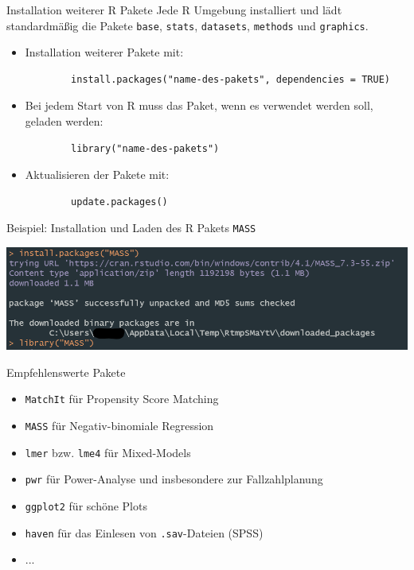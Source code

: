 \documentclass[aspectratio = 169]{chariteBeamer}
\begin{document}
\begin{frame}[fragile]{Installation weiterer \textsf R Pakete}
    Jede \textsf R Umgebung installiert und lädt standardmäßig die Pakete \texttt{base}, \texttt{stats}, \texttt{datasets}, \texttt{methods} und \texttt{graphics}.\bigskip
    \begin{itemize}
        \item Installation weiterer Pakete mit:
        \begin{verbatim}
        install.packages("name-des-pakets", dependencies = TRUE)
        \end{verbatim}
        \item Bei jedem Start von \textsf R muss das Paket, wenn es verwendet werden soll, geladen werden:
        \begin{verbatim}
        library("name-des-pakets")
        \end{verbatim}
        \item Aktualisieren der Pakete mit:
        \begin{verbatim}
        update.packages()
        \end{verbatim}
    \end{itemize}
\end{frame}

\begin{frame}[fragile]{Beispiel: Installation und Laden des \textsf R Pakets \texttt{MASS}}
    \begin{center}
        \includegraphics[width=\textwidth, keepaspectratio]{pakete.png}
    \end{center}
\end{frame}


\begin{frame}[fragile]{Empfehlenswerte Pakete}
	\begin{itemize}
		\item \verb+MatchIt+ für Propensity Score Matching 
	          \item \verb+MASS+ für Negativ-binomiale Regression \\
	          \item \verb+lmer+ bzw. \verb+lme4+ für Mixed-Models \\
	          \item \verb+pwr+ für Power-Analyse und insbesondere zur Fallzahlplanung \\
	          \item \verb+ggplot2+ für schöne Plots \\
	          \item \verb+haven+ für das Einlesen von \verb+.sav+-Dateien (SPSS) \\ 
	          \item ...
	\end{itemize}
\end{frame}
	
\end{document}
